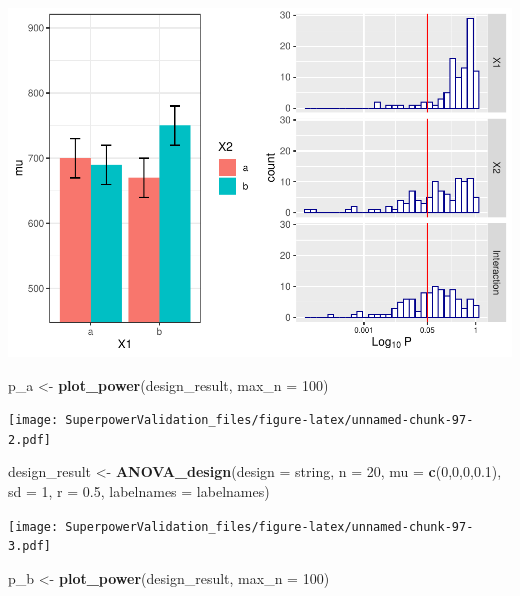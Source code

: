 \documentclass[]{book}
\newenvironment{Shaded}{\begin{snugshade}}{\end{snugshade}}
\newcommand{\DataTypeTok}[1]{\textcolor[rgb]{0.13,0.29,0.53}{#1}}
\newcommand{\DecValTok}[1]{\textcolor[rgb]{0.00,0.00,0.81}{#1}}
\newcommand{\FloatTok}[1]{\textcolor[rgb]{0.00,0.00,0.81}{#1}}
\newcommand{\KeywordTok}[1]{\textcolor[rgb]{0.13,0.29,0.53}{\textbf{#1}}}
\newcommand{\NormalTok}[1]{#1}
\newcommand{\StringTok}[1]{\textcolor[rgb]{0.31,0.60,0.02}{#1}}
\begin{document}
\includegraphics{SuperpowerValidation_files/figure-latex/unnamed-chunk-97-1.pdf}

\begin{Shaded}
\begin{Highlighting}[]
\NormalTok{p_a <-}\StringTok{ }\KeywordTok{plot_power}\NormalTok{(design_result,}
                      \DataTypeTok{max_n =} \DecValTok{100}\NormalTok{)}
\end{Highlighting}
\end{Shaded}

\texttt{[image: SuperpowerValidation\_files/figure-latex/unnamed-chunk-97-2.pdf]}

\begin{Shaded}
\begin{Highlighting}[]
\NormalTok{design_result <-}\StringTok{ }\KeywordTok{ANOVA_design}\NormalTok{(}\DataTypeTok{design =}\NormalTok{ string,}
                              \DataTypeTok{n =} \DecValTok{20}\NormalTok{, }
                              \DataTypeTok{mu =} \KeywordTok{c}\NormalTok{(}\DecValTok{0}\NormalTok{,}\DecValTok{0}\NormalTok{,}\DecValTok{0}\NormalTok{,}\FloatTok{0.1}\NormalTok{), }
                              \DataTypeTok{sd =} \DecValTok{1}\NormalTok{, }
                              \DataTypeTok{r =} \FloatTok{0.5}\NormalTok{, }
                              \DataTypeTok{labelnames =}\NormalTok{ labelnames)}
\end{Highlighting}
\end{Shaded}

\texttt{[image: SuperpowerValidation\_files/figure-latex/unnamed-chunk-97-3.pdf]}

\begin{Shaded}
\begin{Highlighting}[]
\NormalTok{p_b <-}\StringTok{ }\KeywordTok{plot_power}\NormalTok{(design_result,}
                      \DataTypeTok{max_n =} \DecValTok{100}\NormalTok{)}
\end{Highlighting}
\end{Shaded}
\end{document}
